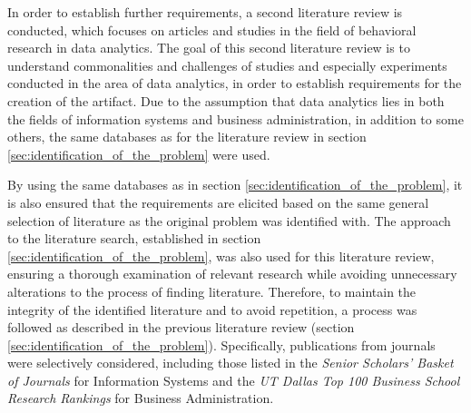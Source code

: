 In order to establish further requirements, a second literature review is conducted, which focuses on articles and studies in the field of behavioral research in data analytics. The goal of this second literature review is to understand commonalities and challenges of studies and especially experiments conducted in the area of data analytics, in order to establish requirements for the creation of the artifact. Due to the assumption that data analytics lies in both the fields of information systems and business administration, in addition to some others, the same databases as for the literature review in section \ref{sec:identification_of_the_problem} were used.

By using the same databases as in section \ref{sec:identification_of_the_problem}, it is also ensured that the requirements are elicited based on the same general selection of literature as the original problem was identified with. The approach to the literature search, established in section \ref{sec:identification_of_the_problem}, was also used for this literature review, ensuring a thorough examination of relevant research while avoiding unnecessary alterations to the process of finding literature. Therefore, to maintain the integrity of the identified literature and to avoid repetition, a process was followed as described in the previous literature review (section \ref{sec:identification_of_the_problem}). Specifically, publications from journals were selectively considered, including those listed in the \textit{Senior Scholars' Basket of Journals} for Information Systems and the \textit{UT Dallas Top 100 Business School Research Rankings} for Business Administration.

